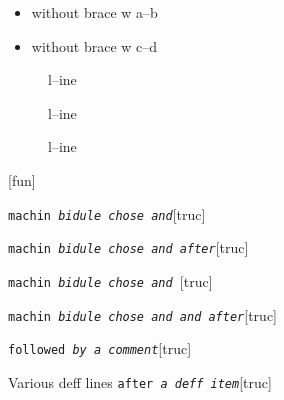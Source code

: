 \documentclass{book}
\begin{document}
\begin{itemize}[label={}]
\item without brace w a--b
\item without brace w c--d
\end{itemize}

\begin{description}
\item[{\parbox[b]{\linewidth}{%
a}}]
l--ine
\end{description}

\begin{description}
\item[{\parbox[b]{\linewidth}{%
a--missing style formatting}}]
l--ine
\end{description}

\begin{description}
\item[{\parbox[b]{\linewidth}{%
a\\
\index[fn]{a@\texttt{a}}%
\index[cp]{index entry between item and itemx}%
b
\index[fn]{b@\texttt{b}}%
}}]
l--ine
\end{description}

\noindent\texttt{}\hfill[fun]



\noindent\texttt{machin \bgroup{}\normalfont{}\textsl{bidule chose and}\egroup{}}\hfill[truc]



%
\noindent\texttt{machin \bgroup{}\normalfont{}\textsl{bidule chose and  after}\egroup{}}\hfill[truc]



%
\noindent\texttt{machin \bgroup{}\normalfont{}\textsl{bidule chose and }\egroup{}}\hfill[truc]



%
\noindent\texttt{machin \bgroup{}\normalfont{}\textsl{bidule chose and and after}\egroup{}}\hfill[truc]



%
\noindent\texttt{followed \bgroup{}\normalfont{}\textsl{by a comment}\egroup{}}\hfill[truc]



%
Various deff lines
\noindent\texttt{after \bgroup{}\normalfont{}\textsl{a deff item}\egroup{}}\hfill[truc]



%
\end{document}
